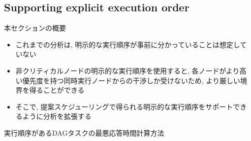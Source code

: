 




\subsection{Supporting explicit execution order}
\label{ssec: Supporting explicit execution order}

\begin{frame}{本セクションの概要}
    \begin{itemize}
        \item これまでの分析は, 明示的な実行順序が事前に分かっていることは想定していない
        \item 非クリティカルノードの明示的な実行順序を使用すると, 各ノードがより高い優先度を持つ同時実行ノードからの干渉しか受けないため, より厳しい境界を得ることができる
        \item そこで, 提案スケジューリングで得られる明示的な実行順序をサポートできるように分析を拡張する
    \end{itemize}
\end{frame}

\begin{frame}{実行順序があるDAGタスクの最悪応答時間計算方法}
\end{frame}

